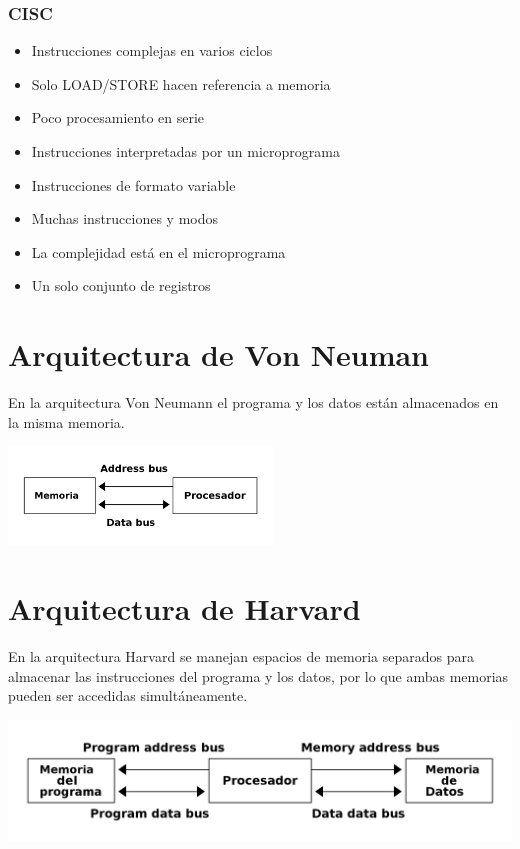 \documentclass[11pt]{article}
\begin{document}
\subsubsection*{CISC}
\label{sec:org814419c}
\begin{mdframed}
\begin{itemize}
\item Instrucciones complejas en varios ciclos
\item Solo LOAD/STORE hacen referencia a memoria
\item Poco procesamiento en serie
\item Instrucciones interpretadas por un microprograma
\item Instrucciones de formato variable
\item Muchas instrucciones y modos
\item La complejidad está en el microprograma
\item Un solo conjunto de registros
\end{itemize}
\end{mdframed}

\section{Arquitectura de Von Neuman}
\label{sec:org9774b8f}
En la arquitectura Von Neumann el programa y los datos están almacenados en la misma memoria.

\begin{center}
\includegraphics[width=7cm]{./img/vonneuman.png}
\end{center}

\section{Arquitectura de Harvard}
\label{sec:orga9009c4}
En la arquitectura Harvard se manejan espacios de memoria separados para almacenar las instrucciones del programa y los datos, por lo que ambas memorias pueden ser accedidas simultáneamente.

\begin{center}
\includegraphics[width=.9\linewidth]{./img/harvard.png}
\end{center}
\end{document}
